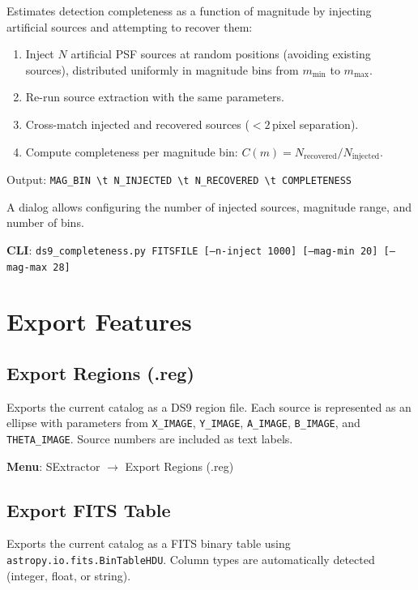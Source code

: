 \documentclass[11pt,fleqn]{book}
\begin{document}
Estimates detection completeness as a function of magnitude by injecting artificial sources and attempting to recover them:

\begin{enumerate}[leftmargin=2em]
  \item Inject $N$ artificial PSF sources at random positions (avoiding existing sources), distributed uniformly in magnitude bins from $m_\text{min}$ to $m_\text{max}$.
  \item Re-run source extraction with the same parameters.
  \item Cross-match injected and recovered sources ($< 2$\,pixel separation).
  \item Compute completeness per magnitude bin: $C(m) = N_\text{recovered} / N_\text{injected}$.
\end{enumerate}

Output: \texttt{MAG\_BIN \textbackslash t N\_INJECTED \textbackslash t N\_RECOVERED \textbackslash t COMPLETENESS}

A dialog allows configuring the number of injected sources, magnitude range, and number of bins.

\textbf{CLI}: \texttt{ds9\_completeness.py FITSFILE [--n-inject 1000] [--mag-min 20] [--mag-max 28]}


\section{Export Features}

\subsection{Export Regions (.reg)}

Exports the current catalog as a DS9 region file. Each source is represented as an ellipse with parameters from \texttt{X\_IMAGE}, \texttt{Y\_IMAGE}, \texttt{A\_IMAGE}, \texttt{B\_IMAGE}, and \texttt{THETA\_IMAGE}. Source numbers are included as text labels.

\textbf{Menu}: SExtractor $\to$ Export Regions (.reg)

\subsection{Export FITS Table}

Exports the current catalog as a FITS binary table using \texttt{astropy.io.fits.BinTableHDU}. Column types are automatically detected (integer, float, or string).
\end{document}
